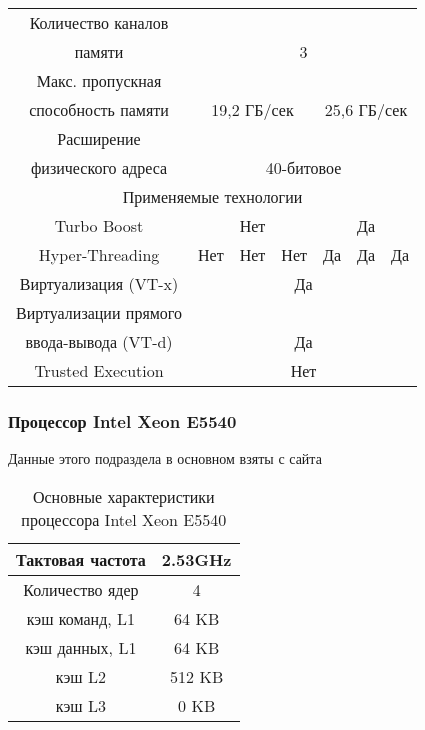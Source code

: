 \begin{center}
\begin{table}[ht]
\begin{tabular}{|c|c|c|c|c|c|c|}
		Количество каналов & \multicolumn{6}{c|}{} \\
		памяти & \multicolumn{6}{c|}{3} \\ \hline
		Макс. пропускная & \multicolumn{6}{c|}{} \\ \hline
		способность памяти & \multicolumn{3}{c|}{19,2 ГБ/сек} & \multicolumn{3}{c|}{25,6 ГБ/сек }\\ \hline
		Расширение         & \multicolumn{6}{c|}{} \\ 
		физического адреса & \multicolumn{6}{c|}{40-битовое} \\ \hline
		\multicolumn{7}{|c|}{Применяемые технологии} \\ \hline
		Turbo Boost & \multicolumn{3}{c|}{Нет} & \multicolumn{3}{c|}{Да} \\ \hline
		Hyper-Threading & Нет & Нет & Нет & Да & Да & Да \\ \hline
		Виртуализация (VT-x) & \multicolumn{6}{c|}{Да} \\ \hline
		Виртуализации прямого & \multicolumn{6}{c|}{} \\
		ввода-вывода (VT-d)   & \multicolumn{6}{c|}{ Да} \\ \hline
		Trusted Execution &   \multicolumn{6}{c|}{ Нет} \\ \hline
	\end{tabular}
\end{table}
\end{center}



\subsubsection{Процессор Intel Xeon  E5540}
Данные этого подраздела в основном взяты с сайта \cite{geek_E5540}


\begin{table}[ht]
\begin{center}
\caption{Основные характеристики процессора Intel Xeon  E5540}
\begin{tabular}{|c|c|}
\hline	
Тактовая частота & 2.53GHz   \\ \hline
Количество ядер & 4 	     \\ \hline
кэш команд, L1 &  64 KB      \\ \hline
кэш данных, L1 &  64 KB       \\ \hline
кэш L2         &  512 KB      \\ \hline
кэш L3         &  0 KB        \\ \hline
\end{tabular}
\end{center} 	
\end{table} 	

